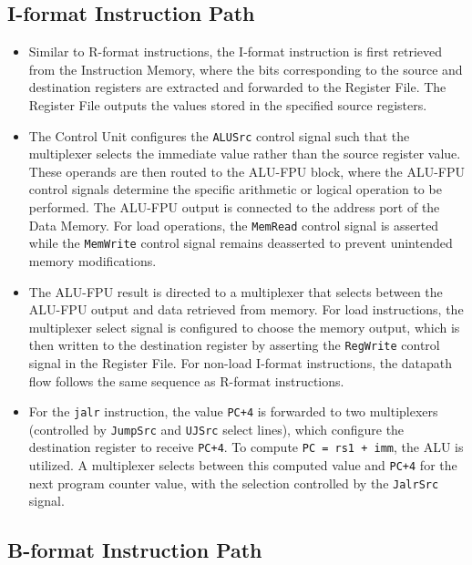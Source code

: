 \documentclass{article}
\begin{document}
\subsection*{I-format Instruction Path}

\begin{itemize}
    \item Similar to R-format instructions, the I-format instruction is first retrieved from the Instruction Memory, where the bits corresponding to the source and destination registers are extracted and forwarded to the Register File. The Register File outputs the values stored in the specified source registers.

    \item The Control Unit configures the \texttt{ALUSrc} control signal such that the multiplexer selects the immediate value rather than the source register value. These operands are then routed to the ALU-FPU block, where the ALU-FPU control signals determine the specific arithmetic or logical operation to be performed. The ALU-FPU output is connected to the address port of the Data Memory. For load operations, the \texttt{MemRead} control signal is asserted while the \texttt{MemWrite} control signal remains deasserted to prevent unintended memory modifications.

    \item The ALU-FPU result is directed to a multiplexer that selects between the ALU-FPU output and data retrieved from memory. For load instructions, the multiplexer select signal is configured to choose the memory output, which is then written to the destination register by asserting the \texttt{RegWrite} control signal in the Register File. For non-load I-format instructions, the datapath flow follows the same sequence as R-format instructions.

    \item For the \texttt{jalr} instruction, the value \texttt{PC+4} is forwarded to two multiplexers (controlled by \texttt{JumpSrc} and \texttt{UJSrc} select lines), which configure the destination register to receive \texttt{PC+4}. To compute \texttt{PC = rs1 + imm}, the ALU is utilized. A multiplexer selects between this computed value and \texttt{PC+4} for the next program counter value, with the selection controlled by the \texttt{JalrSrc} signal.
\end{itemize}

\subsection*{B-format Instruction Path}
\end{document}
